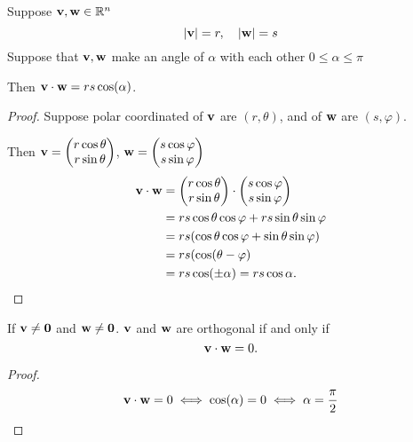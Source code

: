 \documentclass[10pt, a4paper]{article}
\begin{document}
\begin{proposition}
    Suppose $\mathbf{v}, \mathbf{w} \in \mathbb{R} ^ n$
    \[
    |\mathbf{v}| = r,\quad|\mathbf{w}| = s
    \]
    Suppose that $\mathbf{v}, \mathbf{w}$ make an angle of $\alpha$ with each other $0 \leq \alpha \leq \pi$
    
    Then $\mathbf{v}\cdot\mathbf{w} = rs\cos(\alpha)$.
    \begin{proof}
        Suppose polar coordinated of $\mathbf{v}$ are $(r, \theta)$, and of $\mathbf{w}$ are $(s, \varphi)$.

        Then $\mathbf{v} = \begin{pmatrix}
            r\cos\theta \\
            r\sin\theta
        \end{pmatrix}$, $\mathbf{w} = \begin{pmatrix}
            s\cos\varphi \\
            s\sin\varphi
        \end{pmatrix}$
        \begin{align*}
        \mathbf{v\cdot w} &= \begin{pmatrix}
            r\cos\theta \\
            r\sin\theta
        \end{pmatrix} \cdot \begin{pmatrix}
            s\cos\varphi \\
            s\sin\varphi
        \end{pmatrix} \\
        &= rs\cos\theta\cos\varphi + rs\sin\theta\sin\varphi \\
        &= rs(\cos\theta\cos\varphi + \sin\theta\sin\varphi) \\
        &= rs(\cos(\theta - \varphi) \\
        &= rs\cos(\pm\alpha) = rs\cos\alpha.
        \end{align*}
    \end{proof}
\end{proposition}

\begin{corollary}
    If $\mathbf{v} \neq \mathbf{0}$ and $\mathbf{w} \neq \mathbf{0}$.
    $\mathbf{v}$ and $\mathbf{w}$ are orthogonal if and only if
    \[
    \mathbf{v \cdot w} = 0.
    \]
    \begin{proof}
        \[
        \mathbf{v \cdot w} = 0 \iff \cos(\alpha) = 0 \iff \alpha = \frac{\pi}{2}
        \]
    \end{proof}
\end{corollary}
\end{document}
